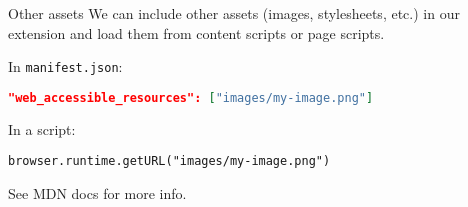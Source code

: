 \documentclass[../index.tex]{subfiles}
\begin{document}
\renewcommand{\currenttitle}{Other assets}
\begin{frame}[fragile]{\currenttitle}
  We can include other assets (images, stylesheets, etc.) in our extension and
  load them from content scripts or page scripts.

  In \texttt{manifest.json}:
  \begin{lstlisting}[language=json]
    "web_accessible_resources": ["images/my-image.png"]
  \end{lstlisting}

  In a script:
  \begin{lstlisting}[language=ES6]
    browser.runtime.getURL("images/my-image.png")
  \end{lstlisting}

  See MDN docs\footnotemark{} for more info.
  
\end{frame}

\end{document}
